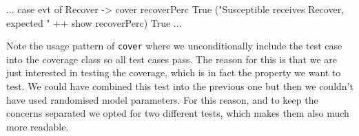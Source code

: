 \begin{HaskellCode}
...
case evt of 
  Recover -> 
    cover recoverPerc True 
     ("Susceptible receives Recover, expected " ++ show recoverPerc) True
...
\end{HaskellCode}

Note the usage pattern of \texttt{cover} where we unconditionally include the test case into the coverage class so all test cases pass. The reason for this is that we are just interested in testing the coverage, which is in fact the property we want to test. We could have combined this test into the previous one but then we couldn't have used randomised model parameters. For this reason, and to keep the concerns separated we opted for two different tests, which makes them also much more readable.

%
%
%

